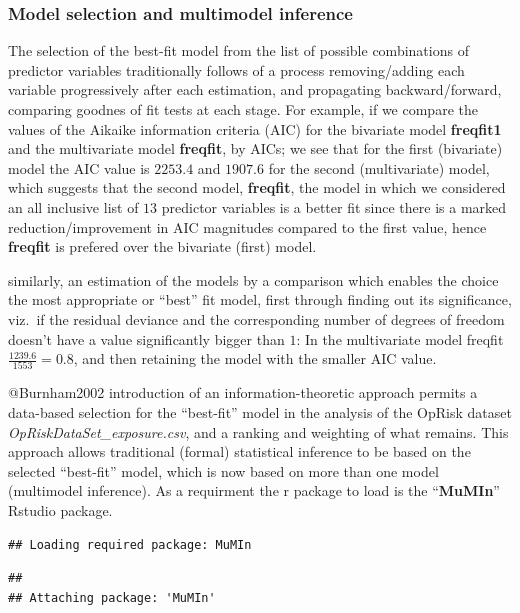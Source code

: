 \documentclass[]{article}
\begin{document}
\singlespacing

\doublespacing

\subsubsection{Model selection and multimodel inference}

The selection of the best-fit model from the list of possible
combinations of predictor variables traditionally follows of a process
removing/adding each variable progressively after each estimation, and
propagating backward/forward, comparing goodnes of fit tests at each
stage. For example, if we compare the values of the Aikaike information
criteria (AIC) for the bivariate model \textbf{freqfit1} and the
multivariate model \textbf{freqfit}, by AICs; we see that for the first
(bivariate) model the AIC value is \(2253.4\) and \(1907.6\) for the
second (multivariate) model, which suggests that the second model,
\textbf{freqfit}, the model in which we considered an all inclusive list
of \(13\) predictor variables is a better fit since there is a marked
reduction/improvement in AIC magnitudes compared to the first value,
hence \textbf{freqfit} is prefered over the bivariate (first) model.
\medskip

similarly, an estimation of the models by a comparison which enables the
choice the most appropriate or ``best'' fit model, first through finding
out its significance, viz.~if the residual deviance and the
corresponding number of degrees of freedom doesn't have a value
significantly bigger than \(1\): In the multivariate model freqfit
\(\frac{1239.6}{1553} = 0.8\), and then retaining the model with the
smaller AIC value.\medskip 

@Burnham2002 introduction of an information-theoretic approach permits a
data-based selection for the ``best-fit'' model in the analysis of the
OpRisk dataset \emph{OpRiskDataSet\_exposure.csv}, and a ranking and
weighting of what remains. This approach allows traditional (formal)
statistical inference to be based on the selected ``best-fit'' model,
which is now based on more than one model (multimodel inference). As a
requirment the r package to load is the ``\textbf{MuMIn}'' Rstudio
package. \medskip

\singlespacing

\begin{verbatim}
## Loading required package: MuMIn
\end{verbatim}

\begin{verbatim}
## 
## Attaching package: 'MuMIn'
\end{verbatim}
\end{document}
